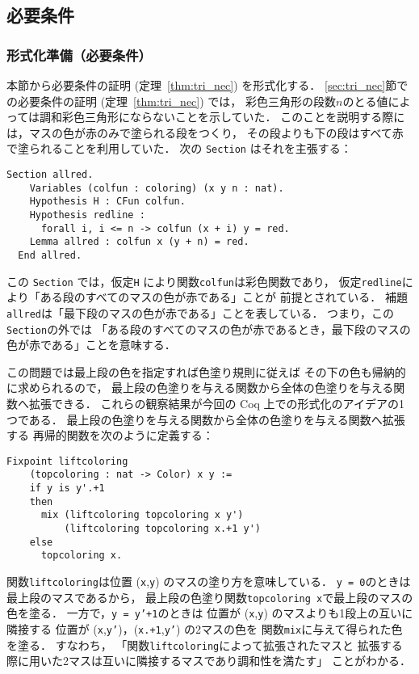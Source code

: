


\subsection{必要条件}
\subsubsection{形式化準備（必要条件）}
本節から必要条件の証明 (定理~\ref{thm:tri_nec}) を形式化する．
\ref{sec:tri_nec}節での必要条件の証明 (定理~\ref{thm:tri_nec}) では，
彩色三角形の段数$n$のとる値によっては調和彩色三角形にならないことを示していた．
このことを説明する際には，マスの色が赤のみで塗られる段をつくり，
その段よりも下の段はすべて赤で塗られることを利用していた．
次の {\tt{Section}} はそれを主張する：
\begin{lstlisting}[language=Coq]
  Section allred.
    Variables (colfun : coloring) (x y n : nat).
    Hypothesis H : CFun colfun.
    Hypothesis redline :
      forall i, i <= n -> colfun (x + i) y = red.
    Lemma allred : colfun x (y + n) = red.
  End allred.
\end{lstlisting}  
この {\tt{Section}} では，仮定{\tt H} により関数{\tt colfun}は彩色関数であり，
仮定{\tt{redline}}により「ある段のすべてのマスの色が赤である」ことが
前提とされている．
補題{\tt{allred}}は「最下段のマスの色が赤である」ことを表している．
つまり，この{\tt{Section}}の外では
「ある段のすべてのマスの色が赤であるとき，最下段のマスの色が赤である」ことを意味する．

この問題では最上段の色を指定すれば色塗り規則に従えば
その下の色も帰納的に求められるので，
最上段の色塗りを与える関数から全体の色塗りを与える関数へ拡張できる．
これらの観察結果が今回の Coq 上での形式化のアイデアの1つである．
最上段の色塗りを与える関数から全体の色塗りを与える関数へ拡張する
再帰的関数を次のように定義する：
\begin{lstlisting}[language=Coq]
  Fixpoint liftcoloring
    (topcoloring : nat -> Color) x y :=
    if y is y'.+1
    then
      mix (liftcoloring topcoloring x y')
          (liftcoloring topcoloring x.+1 y')
    else
      topcoloring x.
\end{lstlisting}
関数{\tt{liftcoloring}}は位置 ({\tt{x}},{\tt{y}}) のマスの塗り方を意味している．
{\tt{y = 0}}のときは最上段のマスであるから，
最上段の色塗り関数{\tt{topcoloring x}}で最上段のマスの色を塗る．
一方で，{\tt{y = y'+1}}のときは
位置が ({\tt{x}},{\tt{y}}) のマスよりも1段上の互いに隣接する
位置が ({\tt{x}},{\tt{y'}})，({\tt{x.+1}},{\tt{y'}}) の2マスの色を
関数{\tt{mix}}に与えて得られた色を塗る．
すなわち，
「関数{\tt{liftcoloring}}によって拡張されたマスと
  拡張する際に用いた2マスは互いに隣接するマスであり調和性を満たす」
ことがわかる．



